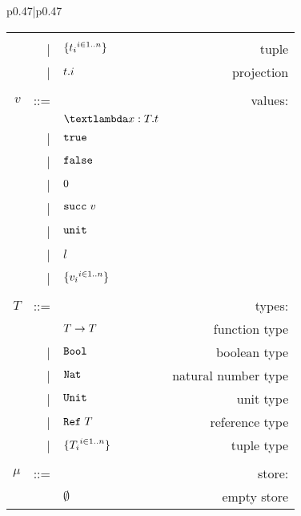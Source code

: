 \begin{figure*}[h]
\begin{tabular}{p{}|p{}}
\begin{tabular}{r@{\hspace{0.5em}}r@{\hspace{0.5em}}l@{\hspace{0.5em}}r}
            &     &                             &                     \\
            & |   & $\{{t_i}^{i\in 1..n}\}$ & tuple               \\
            & |   & $t.i$               & projection          \\
            &     &                             &                     \\
        $v$ & ::= &                             & values:             \\
            &     & $\tyabs{x}{T}{t}$           &                     \\
            & |   & $\texttt{true}$                     &                     \\
            & |   & $\texttt{false}$                    &                     \\
            & |   & $0$                     &                     \\
            & |   & $\texttt{succ\;}v$                 &                     \\
            & |   & $\texttt{unit}$                     &                     \\
            & |   & $l$                         &                     \\
            & |   & $\{{v_i}^{i\in 1..n}\}$ &                     \\
            &     &                             &                     \\
        $T$ & ::= &                             & types:              \\
            &     & $T \rightarrow T$                & function type       \\
            & |   & $\texttt{Bool}$                     & boolean type        \\
            & |   & $\texttt{Nat}$                      & natural number type \\
            & |   & $\texttt{Unit}$                     & unit type           \\
            & |   & $\texttt{Ref\;}T$                   & reference type      \\
            & |   & $\{{T_i}^{i\in 1..n}\}$ & tuple type          \\
            &     &                             &                     \\
      $\mu$ & ::= &                             & store:              \\
            &     & $\emptyset$                 & empty store         \\

\end{tabular}
\end{tabular}
\end{figure*}
